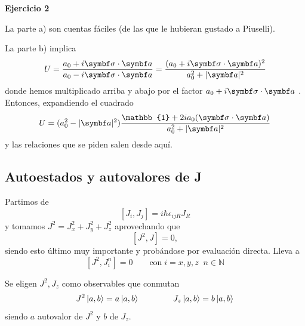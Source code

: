 \documentclass[10pt,oneside]{CBFT_book}
\begin{document}
\begin{ejemplo}{\bf Ejercicio 2}

La parte a) son cuentas fáciles (de las que le hubieran gustado a Piuselli).

La parte b) implica
\[
	U = \frac{ a_0 + i \vb{\sigma}\cdot\vb{a} }{ a_0 - i \vb{\sigma}\cdot\vb{a} }
	= \frac{ (a_0 + i \vb{\sigma}\cdot\vb{a})^2 }{ a_0^2 + |\vb{a}|^2 }
\]
donde hemos multiplicado arriba y abajo por el factor $a_0 + i \vb{\sigma}\cdot\vb{a}$ .
Entonces, expandiendo el cuadrado 
\[
	U = (a_0^2 - |\vb{a}|^2) 
	\frac{ \mathbb{1} + 2 i a_0 (\vb{\sigma}\cdot\vb{a})}{a_0^2 + |\vb{a}|^2}
\]
y las relaciones que se piden salen desde aquí.
 
\end{ejemplo}

\subsection{Autoestados y autovalores de J}

Partimos de 
\[
	[J_i, J_j] =  i\hbar \epsilon_{ijR}J_R
\]
y tomamos $ J^2 = J^2_x + J^2_y + J^2_z $ aprovechando que 
\[
	[J^2,J] = 0,
\]
siendo esto último muy importante y probándose por evaluación directa. Lleva a 
\[
	[J^2,J_i^n] = 0 \qquad \text{con} \; i=x,y,z \;\; n\in\mathbb{N}
\]

Se eligen $J^2, J_z$ como observables que conmutan 
\[
	J^2 \Ket{a,b} = a\Ket{a,b} \qquad \qquad J_z \Ket{a,b} = b\Ket{a,b}
\]
siendo $a$ autovalor de $J^2$ y $b$ de $J_z$.
\end{document}
